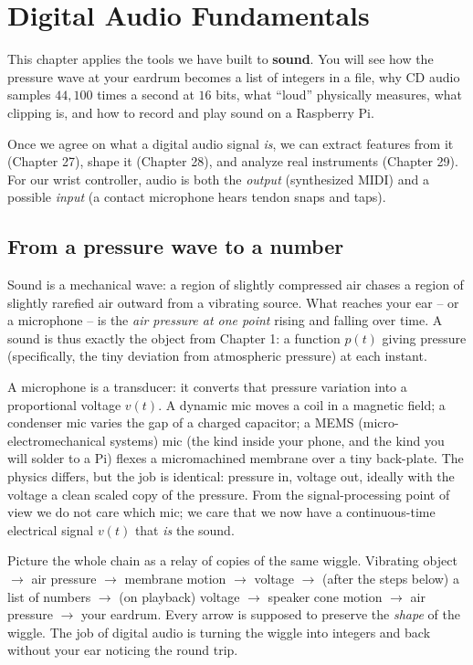 \chapter{Digital Audio Fundamentals}

\chapterline

This chapter applies the tools we have built to \textbf{sound}. You will see how the pressure wave at
your eardrum becomes a list of integers in a file, why CD audio samples $44{,}100$
times a second at $16$ bits, what ``loud'' physically measures, what clipping is, and how to
record and play sound on a Raspberry Pi.

Once we agree on what a digital audio
signal \emph{is}, we can extract features from it (Chapter 27), shape it (Chapter 28), and analyze real instruments
(Chapter 29). For our wrist controller, audio is
both the \emph{output} (synthesized MIDI) and a possible
\emph{input} (a contact microphone hears tendon snaps and taps).

\section{From a pressure wave to a number}
\label{ch26:pressure}

Sound is a mechanical wave: a region of slightly compressed air chases a region of slightly
rarefied air outward from a vibrating source. What reaches your ear -- or a microphone -- is
the \emph{air pressure at one point} rising and falling over time. A sound is thus exactly the object from Chapter 1: a function $p(t)$ giving pressure (specifically, the
tiny deviation from atmospheric pressure) at each instant.

A microphone is a transducer: it converts that pressure variation into a proportional voltage
$v(t)$. A dynamic mic moves a coil in a magnetic field; a condenser mic varies the gap of a
charged capacitor; a MEMS (micro-electromechanical systems) mic (the kind inside your phone, and the kind you will solder to a
Pi) flexes a micromachined membrane over a tiny back-plate. The physics differs, but the job is
identical: pressure in, voltage out, ideally with the voltage a clean scaled copy of the
pressure. From the signal-processing point of view we do not care which mic; we care that we now
have a continuous-time electrical signal $v(t)$ that \emph{is} the sound.

\begin{intuitionbox}
Picture the whole chain as a relay of copies of the same wiggle. Vibrating object $\to$ air
pressure $\to$ membrane motion $\to$ voltage $\to$ (after the steps below) a list of numbers
$\to$ (on playback) voltage $\to$ speaker cone motion $\to$ air pressure $\to$ your eardrum.
Every arrow is supposed to preserve the \emph{shape} of the wiggle. The job of digital audio is
turning the wiggle into integers and back without your ear noticing the round trip.
\end{intuitionbox}

